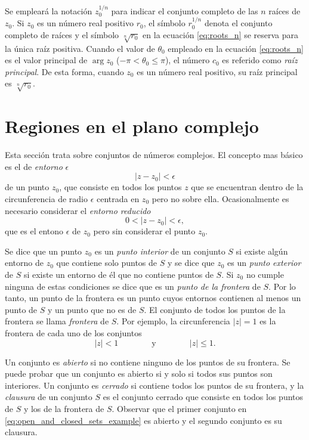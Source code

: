 \documentclass[a4paper]{report}
\begin{document}
Se empleará la notación \(z_0^{1/n}\) para indicar el conjunto completo de las \(n\) raíces de \(z_0\). Si \(z_0\) es un número real positivo \(r_0\), el símbolo \(r_0^{1/n}\) denota el conjunto completo de raíces y el símbolo \(\sqrt[n]{r_0}\) en la ecuación \ref{eq:roots_n} se reserva para la única raíz positiva. Cuando el valor de \(\theta_0\) empleado en la ecuación \ref{eq:roots_n} es el valor principal de \(\arg z_0\) (\(-\pi<\theta_0\leq\pi\)), el número \(c_0\) es referido como \emph{raíz principal}. De esta forma, cuando \(z_0\) es un número real positivo, su raíz principal es \(\sqrt[n]{r_0}\).

\section{Regiones en el plano complejo}\label{sec:complex_plane_regions}

Esta sección trata sobre conjuntos de números complejos. El concepto mas básico es el de \emph{entorno} \(\epsilon\)
\[
 |z-z_0|<\epsilon
\]
de un punto \(z_0\), que consiste en todos los puntos \(z\) que se encuentran dentro de la circunferencia de radio \(\epsilon\) centrada en \(z_0\) pero no sobre ella. Ocasionalmente es necesario considerar el \emph{entorno reducido}
\[
 0<|z-z_0|<\epsilon,
\]
que es el entono \(\epsilon\) de \(z_0\) pero sin considerar el punto \(z_0\).

Se dice que un punto \(z_0\) es un \emph{punto interior} de un conjunto \(S\) si existe algún entorno de \(z_0\) que contiene solo puntos de \(S\) y se dice que \(z_0\) es un \emph{punto exterior} de \(S\) si existe un entorno de él que no contiene puntos de \(S\). Si \(z_0\) no cumple ninguna de estas condiciones se dice que es un \emph{punto de la frontera} de \(S\). Por lo tanto, un punto de la frontera es un punto cuyos entornos contienen al menos un punto de \(S\) y un punto que no es de \(S\). El conjunto de todos los puntos de la frontera se llama \emph{frontera} de \(S\). Por ejemplo, la circunferencia \(|z|=1\) es la frontera de cada uno de los conjuntos
\begin{equation}\label{eq:open_and_closed_sets_example}
 |z|<1
 \qquad\qquad\textrm{y}\qquad\qquad
 |z|\leq1.
\end{equation}

Un conjunto es \emph{abierto} si no contiene ninguno de los puntos de su frontera. Se puede probar que un conjunto es abierto si y solo si todos sus puntos son interiores. Un conjunto es \emph{cerrado} si contiene todos los puntos de su frontera, y la \emph{clausura} de un conjunto \(S\) es el conjunto cerrado que consiste en todos los puntos de \(S\) y los de la frontera de \(S\). Observar que el primer conjunto en \ref{eq:open_and_closed_sets_example} es abierto y el segundo conjunto es su clausura.
\end{document}
